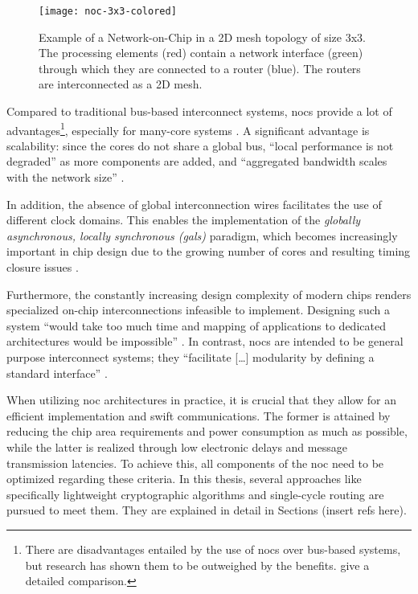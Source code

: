 \begin{figure}
    \centering
    \texttt{[image: noc-3x3-colored]}
    \caption[Example of a 3x3 mesh NoC]{Example of a Network-on-Chip in a 2D mesh topology of size 3x3. The processing elements (red) contain a network interface
    (green) through which they are connected to a router (blue). The routers are interconnected as a 2D mesh.}
    \label{fig:nocexample}
\end{figure}

Compared to traditional bus-based interconnect systems, \glspl{noc} provide a lot of advantages\footnote{There are disadvantages entailed by
the use of \glspl{noc} over bus-based systems, but research has shown them to be outweighed by the benefits. \citeauthor{tatas16designingnocs}
\cite{tatas16designingnocs} give a detailed comparison.}, especially for many-core systems
\cite[5\psqq]{tatas16designingnocs}. A significant advantage is scalability: since the cores do not share a global bus, \enquote{local performance is not
degraded} \cite[6]{tatas16designingnocs} as more components are added, and \enquote{aggregated bandwidth scales with the network size}
\cite[6]{tatas16designingnocs}.

In addition, the absence of global interconnection wires facilitates the use of different clock domains. This enables the implementation of the
\textit{globally asynchronous, locally synchronous (\gls{gals})} paradigm, which becomes increasingly important in chip design due to the growing
number of cores and resulting timing closure issues \cites[3]{kumar02networkonchip}[2]{ivanov05nocintroduction}.

Furthermore, the constantly increasing design complexity of modern chips \cite{mack11mooreslaw} renders specialized on-chip
interconnections infeasible to implement. Designing such a system \enquote{would take too much time and mapping of applications to dedicated
architectures would be impossible} \cite[1]{kumar02networkonchip}. In contrast, \glspl{noc} are intended to be general purpose interconnect systems; they
\enquote{facilitate […] modularity by defining a standard interface} \cite[1]{dally01routepacketsnotwires}.

When utilizing \gls{noc} architectures in practice, it is crucial that they allow for an efficient implementation and swift communications. The
former is attained by reducing the chip area requirements and power consumption as much as possible, while the latter is realized
through low electronic delays and message transmission latencies. To achieve this, all components of the \gls{noc} need to be optimized regarding
these criteria. In this thesis, several approaches like specifically lightweight cryptographic algorithms and single-cycle routing are pursued to
meet them. They are explained in detail in Sections (insert refs here).%

